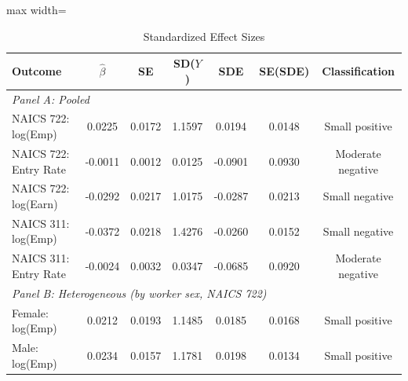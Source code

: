 \begin{table}[t]
\centering
\caption{Standardized Effect Sizes}
\label{tab:sde}
\begin{adjustbox}{max width=\textwidth}
\begin{tabular}{lcccccc}
\toprule
Outcome & $\hat{\beta}$ & SE & SD($Y$) & SDE & SE(SDE) & Classification \\
\midrule
\multicolumn{7}{l}{\textit{Panel A: Pooled}} \\
NAICS 722: log(Emp) & 0.0225 & 0.0172 & 1.1597 & 0.0194 & 0.0148 & Small positive \\
NAICS 722: Entry Rate & -0.0011 & 0.0012 & 0.0125 & -0.0901 & 0.0930 & Moderate negative \\
NAICS 722: log(Earn) & -0.0292 & 0.0217 & 1.0175 & -0.0287 & 0.0213 & Small negative \\
NAICS 311: log(Emp) & -0.0372 & 0.0218 & 1.4276 & -0.0260 & 0.0152 & Small negative \\
NAICS 311: Entry Rate & -0.0024 & 0.0032 & 0.0347 & -0.0685 & 0.0920 & Moderate negative \\
\midrule
\multicolumn{7}{l}{\textit{Panel B: Heterogeneous (by worker sex, NAICS 722)}} \\
Female: log(Emp) & 0.0212 & 0.0193 & 1.1485 & 0.0185 & 0.0168 & Small positive \\
Male: log(Emp) & 0.0234 & 0.0157 & 1.1781 & 0.0198 & 0.0134 & Small positive \\
\bottomrule
\end{tabular}
\end{adjustbox}


\end{table}
